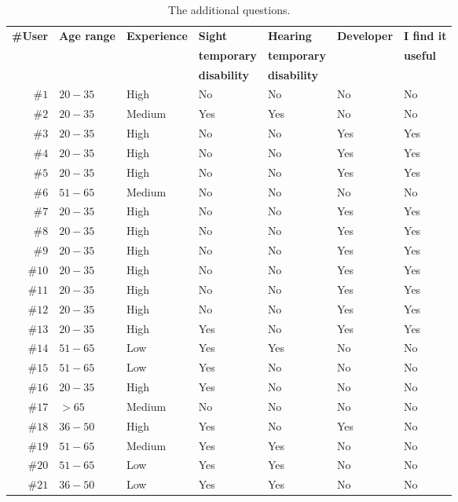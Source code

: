 \begin{table}
  \caption{The additional questions.}
 \label{tbl:additional_questions}
\footnotesize
\centering
 \begin{tabular}{r l l l l l l}
  \hline 
  \textbf{\#User} 	& \textbf{Age range} 	& \textbf{Experience} & \textbf{Sight} & \textbf{Hearing} & \textbf{Developer} & \textbf{I find it} \\
			&   			& 		      & \textbf{temporary}       & \textbf{temporary}	&	& \textbf{useful}\\
			& 			& 		      & \textbf{disability}	 & \textbf{disability} & & \\
  \hline
  $\#1$ & $20-35$	& High		& No	& No	& No	& No	\\
  $\#2$ & $20-35$ 	& Medium	& Yes	& Yes	& No	& No	\\
  $\#3$ & $20-35$ 	& High		& No	& No	& Yes	& Yes	\\
  $\#4$ & $20-35$ 	& High		& No	& No	& Yes	& Yes	\\
  $\#5$ & $20-35$ 	& High		& No	& No	& Yes	& Yes	\\
  $\#6$ & $51-65$ 	& Medium	& No	& No	& No	& No	\\
  $\#7$ & $20-35$ 	& High		& No	& No	& Yes	& Yes	\\
  $\#8$ & $20-35$ 	& High		& No	& No	& Yes	& Yes	\\
  $\#9$ & $20-35$ 	& High		& No	& No	& Yes	& Yes	\\
  $\#10$ & $20-35$ 	& High		& No	& No	& Yes	& Yes	\\
  $\#11$ & $20-35$ 	& High		& No	& No	& Yes	& Yes	\\
  $\#12$ & $20-35$ 	& High		& No	& No	& Yes	& Yes	\\
  $\#13$ & $20-35$ 	& High		& Yes	& No	& Yes	& Yes	\\
  $\#14$ & $51-65$ 	& Low		& Yes	& Yes	& No	& No	\\
  $\#15$ & $51-65$ 	& Low		& Yes	& No	& No	& No	\\
  $\#16$ & $20-35$ 	& High		& Yes	& No	& No	& No	\\
  $\#17$ & $>65$ 	& Medium	& No	& No	& No	& No	\\
  $\#18$ & $36-50$ 	& High		& Yes	& No	& Yes	& No	\\
  $\#19$ & $51-65$ 	& Medium	& Yes	& Yes	& No	& No	\\
  $\#20$ & $51-65$ 	& Low		& Yes	& Yes	& No	& No	\\
  $\#21$ & $36-50$ 	& Low		& Yes	& Yes	& No	& No	\\

\end{tabular}
\end{table}
